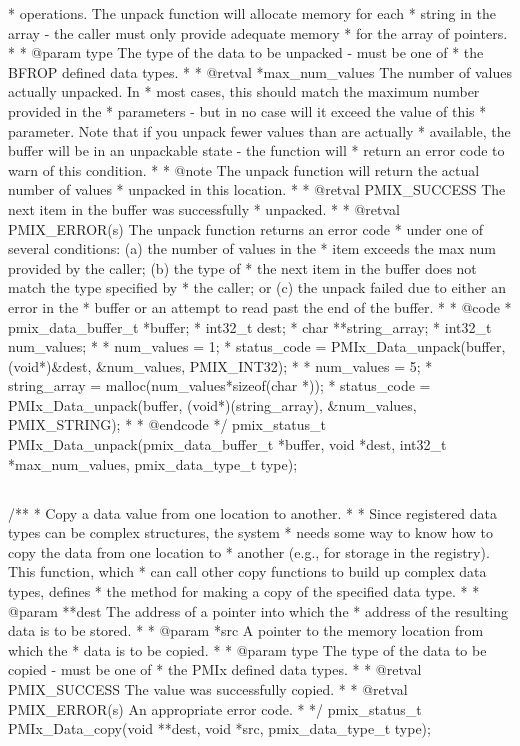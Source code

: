 \begin{codepar}
 * operations. The unpack function will allocate memory for each
 * string in the array - the caller must only provide adequate memory
 * for the array of pointers.
 *
 * @param type The type of the data to be unpacked - must be one of
 * the BFROP defined data types.
 *
 * @retval *max_num_values The number of values actually unpacked. In
 * most cases, this should match the maximum number provided in the
 * parameters - but in no case will it exceed the value of this
 * parameter.  Note that if you unpack fewer values than are actually
 * available, the buffer will be in an unpackable state - the function will
 * return an error code to warn of this condition.
 *
 * @note The unpack function will return the actual number of values
 * unpacked in this location.
 *
 * @retval PMIX_SUCCESS The next item in the buffer was successfully
 * unpacked.
 *
 * @retval PMIX_ERROR(s) The unpack function returns an error code
 * under one of several conditions: (a) the number of values in the
 * item exceeds the max num provided by the caller; (b) the type of
 * the next item in the buffer does not match the type specified by
 * the caller; or (c) the unpack failed due to either an error in the
 * buffer or an attempt to read past the end of the buffer.
 *
 * @code
 * pmix_data_buffer_t *buffer;
 * int32_t dest;
 * char **string_array;
 * int32_t num_values;
 *
 * num_values = 1;
 * status_code = PMIx_Data_unpack(buffer, (void*)&dest, &num_values, PMIX_INT32);
 *
 * num_values = 5;
 * string_array = malloc(num_values*sizeof(char *));
 * status_code = PMIx_Data_unpack(buffer, (void*)(string_array), &num_values, PMIX_STRING);
 *
 * @endcode
 */
pmix_status_t
PMIx_Data_unpack(pmix_data_buffer_t *buffer, void *dest,
                 int32_t *max_num_values,
                 pmix_data_type_t type);
\end{codepar}
\cspecificend


\subsection{}

\cspecificstart
\begin{codepar}
/**
 * Copy a data value from one location to another.
 *
 * Since registered data types can be complex structures, the system
 * needs some way to know how to copy the data from one location to
 * another (e.g., for storage in the registry). This function, which
 * can call other copy functions to build up complex data types, defines
 * the method for making a copy of the specified data type.
 *
 * @param **dest The address of a pointer into which the
 * address of the resulting data is to be stored.
 *
 * @param *src A pointer to the memory location from which the
 * data is to be copied.
 *
 * @param type The type of the data to be copied - must be one of
 * the PMIx defined data types.
 *
 * @retval PMIX_SUCCESS The value was successfully copied.
 *
 * @retval PMIX_ERROR(s) An appropriate error code.
 *
 */
pmix_status_t
PMIx_Data_copy(void **dest, void *src,
               pmix_data_type_t type);
\end{codepar}
\cspecificend


